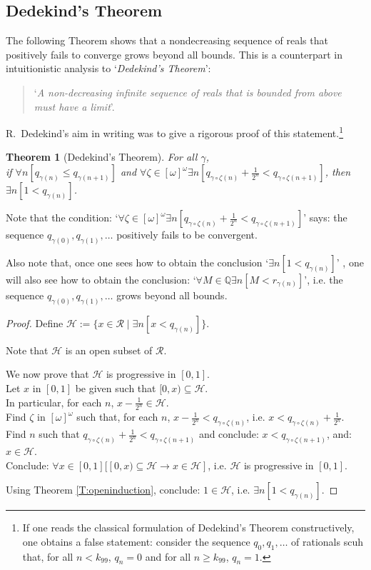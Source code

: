 \documentclass[a4paper]{amsart}
\theoremstyle{plain}
\newtheorem{theorem}{Theorem}
\begin{document}
 
\subsection{Dedekind's Theorem}\label{SS:dedekind} The following Theorem shows that a nondecreasing sequence of reals that positively fails to converge grows beyond all bounds. This is a counterpart in intuitionistic analysis to `{\it Dedekind's Theorem}':  \begin{quote}`{\it  A non-decreasing infinite sequence of reals that is bounded from above must have a limit}'. \end{quote}R.~Dedekind's aim in writing \cite{dedekind} was  to give a rigorous proof of this statement.\footnote{If one reads the classical formulation of Dedekind's Theorem constructively, one obtains a false statement: consider the sequence $q_0, q_1, \ldots$ of rationals scuh that, for all $n<k_{99}$, $q_n=0$ and for all $n\ge k_{99}$, $q_n=1$.} 


\begin{theorem}[Dedekind's Theorem]\label{T:dedekind}For all $\gamma$, \\if $\forall n[q_{\gamma(n)}\le q_{ \gamma(n+1)}]$ and $\forall \zeta \in [\omega]^\omega\exists n [ q_{\gamma\circ\zeta(n)} + \frac{1}{2^n}< q_{ \gamma\circ\zeta(n+1)}]$, then $\exists n[ 1 <q_{ \gamma(n)}]$.\end{theorem}
 
 Note that the condition: `$\forall \zeta \in [\omega]^\omega\exists n [ q_{\gamma\circ\zeta(n)} + \frac{1}{2^n}< q_{ \gamma\circ\zeta(n+1)}]$' says: the sequence $q_{\gamma(0)}, q_{\gamma(1)}, \ldots$ positively fails to be convergent.
 
 Also note that, once one sees how to obtain the conclusion `$\exists n[ 1 <q_{ \gamma(n)}]$' , one will also see how to obtain the conclusion:  `$\forall M\in \mathbb{Q}\exists n[ M<r_{\gamma(n)}]$', i.e. the sequence $q_{\gamma(0)}, q_{\gamma(1)}, \ldots$  grows beyond all bounds.
 
\begin{proof} Define $\mathcal{H}:=\{x\in \mathcal{R}\mid \exists n[x<q_{\gamma(n)}]\}$. 

Note that $\mathcal{H}$ is an open subset of $\mathcal{R}$.

We now prove that $\mathcal{H}$ is progressive in $[0,1]$. 
\\Let $x$ in $[0,1]$ be given such that $[0,x)\subseteq \mathcal{H}$.\\In particular, for each $n$, $x-\frac{1}{2^n} \in \mathcal{H}$. \\ Find $\zeta$ in $[\omega]^\omega$ such that, for each $n$, $x-\frac{1}{2^n} < q_{\gamma\circ\zeta(n)}$, i.e. $x<q_{\gamma\circ\zeta(n)}+\frac{1}{2^n}$. \\ Find $n$ such that $q_{\gamma\circ\zeta(n)} +\frac{1}{2^n}<q_{\gamma\circ\zeta(n+1)}$ and conclude: $x<q_{\gamma\circ\zeta(n+1)}$, and: $x\in \mathcal{H}$.\\Conclude:  $\forall x \in [0,1][[0,x)\subseteq \mathcal{H}\rightarrow x \in \mathcal{H}]$, i.e. 
$\mathcal{H}$ is progressive in $[0,1]$.

\smallskip Using Theorem \ref{T:openinduction},  conclude: $1\in \mathcal{H}$, i.e.
$\exists n[1<q_{\gamma(n)}]$.  \end{proof}
\end{document}
